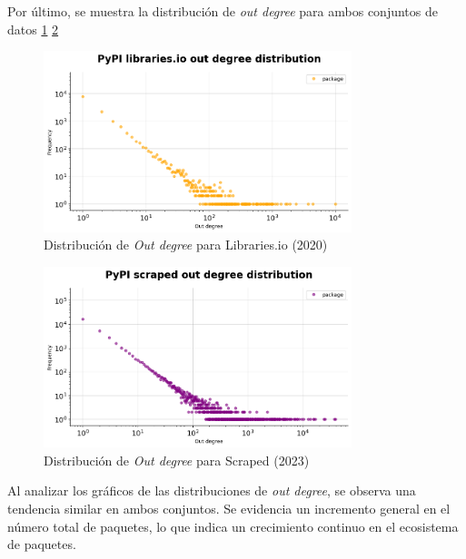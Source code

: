 Por último, se muestra la distribución de \textit{out degree} para ambos conjuntos de datos \ref{fig:pypi_libio_outd_dist} \ref{fig:pypi_scraped_outd_dist}

\begin{figure}[ht!]
    \begin{center}
        \includegraphics[width=0.8\textwidth]{img/pypi/outd_libio_dist.png}
        \caption{Distribución de \textit{Out degree} para Libraries.io (2020)}
        \label{fig:pypi_libio_outd_dist}
    \end{center}
\end{figure}

\begin{figure}[ht!]
    \begin{center}
        \includegraphics[width=0.8\textwidth]{img/pypi/outd_scraped_dist.png}
        \caption{Distribución de \textit{Out degree} para Scraped (2023)}
        \label{fig:pypi_scraped_outd_dist}
    \end{center}
\end{figure}

Al analizar los gráficos de las distribuciones de \textit{out degree}, se observa una tendencia similar
en ambos conjuntos. Se evidencia un incremento general en el número total de paquetes, lo que indica un
crecimiento continuo en el ecosistema de paquetes.

